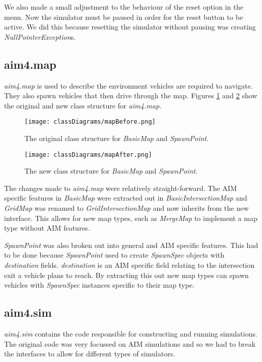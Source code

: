 We also made a small adjustment to the behaviour of the reset option in the menu. Now the simulator must be paused in order for the reset button to be active. We did this because resetting the simulator without pausing was creating \emph{NullPointerException}s.

\subsection{aim4.map}
\label{subsec:aim4.map}
\emph{aim4.map} is used to describe the environment vehicles are required to navigate. They also spawn vehicles that then drive through the map. Figures \ref{fig:mapBefore} and \ref{fig:mapAfter} show the original and new class structure for \emph{aim4.map}.

\begin{figure}[htb]
\texttt{[image: classDiagrams/mapBefore.png]}
\caption{The original class structure for \emph{BasicMap} and \emph{SpawnPoint}.}
\label{fig:mapBefore}
\end{figure}

\begin{figure}[htb]
\texttt{[image: classDiagrams/mapAfter.png]}
\caption{The new class structure for \emph{BasicMap} and \emph{SpawnPoint}.}
\label{fig:mapAfter}
\end{figure}

The changes made to \emph{aim4.map} were relatively straight-forward. The AIM specific features in \emph{BasicMap} were extracted out in \emph{BasicIntersectionMap} and \emph{GridMap} was renamed to \emph{GridIntersectionMap} and now inherits from the new interface. This allows for new map types, such as \emph{MergeMap} to implement a map type without AIM features.

\emph{SpawnPoint} was also broken out into general and AIM specific features. This had to be done because \emph{SpawnPoint} used to create \emph{SpawnSpec} objects with \emph{destination} fields. \emph{destination} is an AIM specific field relating to the intersection exit a vehicle plans to reach. By extracting this out new map types can spawn vehicles with \emph{SpawnSpec} instances specific to their map type.

\subsection{aim4.sim}
\label{subsec:aim4.sim}
\emph{aim4.sim} contains the code responsible for constructing and running simulations. The original code was very focussed on AIM simulations and so we had to break the interfaces to allow for different types of simulators. 

